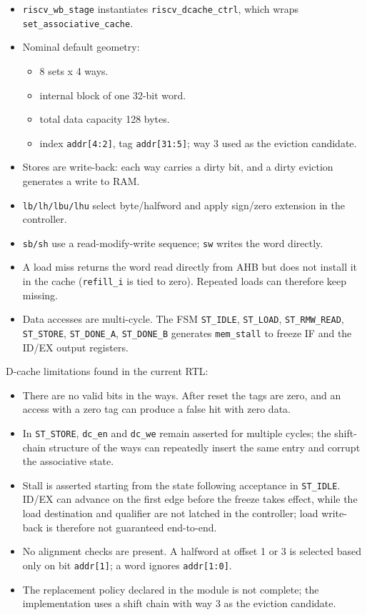 \documentclass[]{article}
\providecommand{\tightlist}{%
  \setlength{\itemsep}{0pt}\setlength{\parskip}{0pt}}
\begin{document}
\begin{itemize}
\tightlist
\item
  \texttt{riscv\_wb\_stage} instantiates \texttt{riscv\_dcache\_ctrl},
  which wraps \texttt{set\_associative\_cache}.
\item
  Nominal default geometry:

  \begin{itemize}
  \tightlist
  \item
    8 sets x 4 ways.
  \item
    internal block of one 32-bit word.
  \item
    total data capacity 128 bytes.
  \item
    index \texttt{addr{[}4:2{]}}, tag \texttt{addr{[}31:5{]}}; way 3
    used as the eviction candidate.
  \end{itemize}
\item
  Stores are write-back: each way carries a dirty bit, and a dirty
  eviction generates a write to RAM.
\item
  \texttt{lb/lh/lbu/lhu} select byte/halfword and apply sign/zero
  extension in the controller.
\item
  \texttt{sb/sh} use a read-modify-write sequence; \texttt{sw} writes
  the word directly.
\item
  A load miss returns the word read directly from AHB but does not
  install it in the cache (\texttt{refill\_i} is tied to zero). Repeated
  loads can therefore keep missing.
\item
  Data accesses are multi-cycle. The FSM \texttt{ST\_IDLE},
  \texttt{ST\_LOAD}, \texttt{ST\_RMW\_READ}, \texttt{ST\_STORE},
  \texttt{ST\_DONE\_A}, \texttt{ST\_DONE\_B} generates
  \texttt{mem\_stall} to freeze IF and the ID/EX output registers.
\end{itemize}

D-cache limitations found in the current RTL:

\begin{itemize}
\tightlist
\item
  There are no valid bits in the ways. After reset the tags are zero,
  and an access with a zero tag can produce a false hit with zero data.
\item
  In \texttt{ST\_STORE}, \texttt{dc\_en} and \texttt{dc\_we} remain
  asserted for multiple cycles; the shift-chain structure of the ways
  can repeatedly insert the same entry and corrupt the associative
  state.
\item
  Stall is asserted starting from the state following acceptance in
  \texttt{ST\_IDLE}. ID/EX can advance on the first edge before the
  freeze takes effect, while the load destination and qualifier are not
  latched in the controller; load write-back is therefore not guaranteed
  end-to-end.
\item
  No alignment checks are present. A halfword at offset 1 or 3 is
  selected based only on bit \texttt{addr{[}1{]}}; a word ignores
  \texttt{addr{[}1:0{]}}.
\item
  The replacement policy declared in the module is not complete; the
  implementation uses a shift chain with way 3 as the eviction
  candidate.
\end{itemize}
\end{document}
